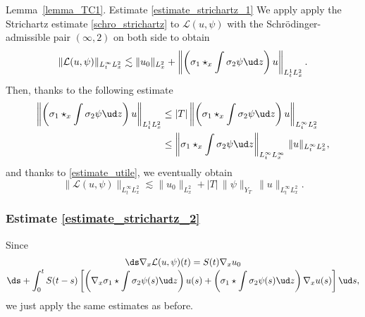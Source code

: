 \begin{ProofOf}{Lemma~\ref{lemma_TC1}. Estimate \eqref{estimate_strichartz_1}} We apply apply the Strichartz estimate \eqref{schro_strichartz} to $\mathcal{L}(u,\psi)$ with the Schrödinger-admissible pair $(\infty,2)$ on both side to obtain
\[
\|\mathcal{L}(u,\psi)\|_{L_{t}^{\infty}L_{x}^{2}}\lesssim\|u_{0}\|_{L_{x}^{2}}+\left\|\left(\sigma_{1}\star_{x}\int\sigma_{2}\psi\ud z\right)u\right\|_{L_{t}^{1}L_{x}^{2}}.
\]
Then, thanks to the following estimate
\begin{align*}
\left\|\left(\sigma_{1}\star_{x}\int\sigma_{2}\psi\ud z\right)u\right\|_{L_{t}^{1}L_{x}^{2}}&\leq |T|\left\|\left(\sigma_{1}\star_{x}\int\sigma_{2}\psi\ud z\right)u\right\|_{L_{t}^{\infty}L_{x}^{2}}\\
&\leq\left\|\sigma_{1}\star_{x}\int\sigma_{2}\psi\ud z\right\|_{L_{t}^{\infty}L_{x}^{\infty}}\,\|u\|_{L_{t}^{\infty}L_{x}^{2}},
\end{align*}
and thanks to \eqref{estimate_utile}, we eventually obtain
\[
\|\mathcal{L}(u,\psi)\|_{L_{t}^{\infty}L_{x}^{2}}\lesssim\|u_{0}\|_{L_{x}^{2}}+|T|\,\|\psi\|_{Y_{T}}\,\|u\|_{L_{t}^{\infty}L_{x}^{2}}.
\]

\subsubsection*{Estimate \eqref{estimate_strichartz_2}} Since\vspace*{-3pt}
\begin{multline*}
\ds\nabla_{x}\mathcal{L}(u,\psi)(t)=S(t)\nabla_{x}u_{0}\\[-3pt]
\ds+\int_{0}^{t}S(t-s)\left[\left(\nabla_{x}\sigma_{1}\star\int\sigma_{2}\psi(s)\ud z\right)u(s)+\left(\sigma_{1}\star\int\sigma_{2}\psi(s)\ud z\right)\nabla_{x}u(s)\right]\ud s,
\end{multline*}
we just apply the same estimates as before.


\end{ProofOf}
